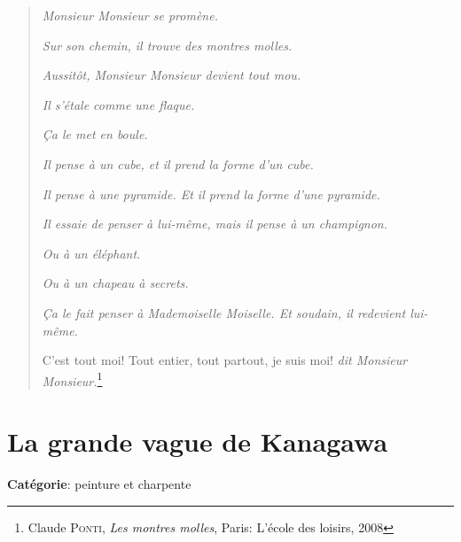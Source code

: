 \documentclass[a4paper,11pt,bibliography=totoc,numbers=noenddot,listof=flat,DIV=11,BCOR=0mm]{scrreprt}%
\begin{document}
\newpage	

\begin{quotation}\emph{Monsieur Monsieur se promène.\\}

\emph{Sur son chemin, il trouve des montres molles.\\}

\emph{Aussitôt, Monsieur Monsieur devient tout mou.\\}

\emph{Il s'étale comme une flaque.\\}

\emph{Ça le met en boule.\\}

\emph{Il pense à un cube, et il prend la forme d'un cube.\\}

\emph{Il pense à une pyramide. Et il prend la forme d'une pyramide.\\}

\emph{Il essaie de penser à lui-même, mais il pense à un champignon.\\}

\emph{Ou à un éléphant.\\}

\emph{Ou à un chapeau à secrets.\\}

\emph{Ça le fait penser à Mademoiselle Moiselle. Et soudain, il redevient lui-même.\\}

\og{} C'est tout moi! Tout entier, tout partout, je suis moi! \fg{} \emph{dit Monsieur Monsieur.}\footnote{Claude \textsc{Ponti}, \emph{Les montres molles}, Paris: L'école des loisirs, 2008}\end{quotation}




\chapter[Peinture et charpente: La grande vague de Kanagawa]{La grande vague de Kanagawa}

{\large \textbf{Catégorie}}:
 peinture et charpente
 
\end{document}
